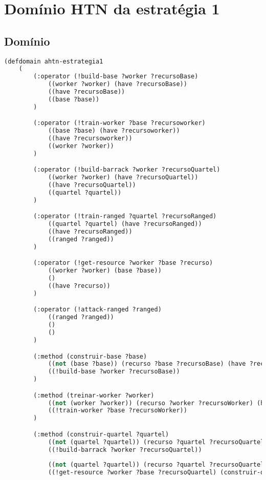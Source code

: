 
\chapter{\label{ap:estra1}Domínio HTN da estratégia 1}

\section{Domínio}

\lstset{style=codeStyle}
\begin{lstlisting}[language=lisp]
(defdomain ahtn-estrategia1
	(
		(:operator (!build-base ?worker ?recursoBase)
			((worker ?worker) (have ?recursoBase))
			((have ?recursoBase))
			((base ?base))
		)

		(:operator (!train-worker ?base ?recursoworker)
			((base ?base) (have ?recursoworker))
			((have ?recursoworker))
			((worker ?worker))
		)

		(:operator (!build-barrack ?worker ?recursoQuartel)
			((worker ?worker) (have ?recursoQuartel))
			((have ?recursoQuartel))
			((quartel ?quartel))
		)

		(:operator (!train-ranged ?quartel ?recursoRanged)
			((quartel ?quartel) (have ?recursoRanged))
			((have ?recursoRanged))
			((ranged ?ranged))
		)

		(:operator (!get-resource ?worker ?base ?recurso)
			((worker ?worker) (base ?base))
			()
			((have ?recurso))
		)

		(:operator (!attack-ranged ?ranged)
			((ranged ?ranged))
			()
			()
		)

		(:method (construir-base ?base)
			((not (base ?base)) (recurso ?base ?recursoBase) (have ?recursoBase) (worker ?worker))
			((!build-base ?worker ?recursoBase))
		)

		(:method (treinar-worker ?worker)
			((not (worker ?worker)) (recurso ?worker ?recursoWorker) (have ?recursoWorker) (base ?base))
			((!train-worker ?base ?recursoWorker))
		)

		(:method (construir-quartel ?quartel)
			((not (quartel ?quartel)) (recurso ?quartel ?recursoQuartel) (have ?recursoQuartel) (worker ?worker)) 
			((!build-barrack ?worker ?recursoQuartel))
			
			((not (quartel ?quartel)) (recurso ?quartel ?recursoQuartel) (not (have ?recursoQuartel)) (worker ?worker) (base ?base))
			((!get-resource ?worker ?base ?recursoQuartel) (construir-quartel ?quartel))
			

\end{lstlisting}
